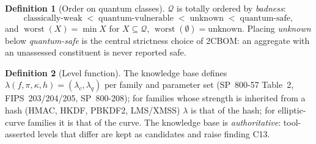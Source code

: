 \documentclass[11pt,a4paper]{article}
\newcommand{\twocbom}{2CBOM}
\newcommand{\Q}{\mathcal{Q}}
\newcommand{\worst}{\operatorname{worst}}
\theoremstyle{definition}
\newtheorem{definition}{Definition}[section]
\theoremstyle{plain}
\begin{document}
\begin{definition}[Order on quantum classes]
$\Q$ is totally ordered by \emph{badness}:
$$\text{classically-weak} \;<\; \text{quantum-vulnerable} \;<\; \text{unknown} \;<\; \text{quantum-safe},$$
and $\worst(X) = \min X$ for $X \subseteq \Q$, $\worst(\emptyset) = \text{unknown}$.
Placing \emph{unknown} below \emph{quantum-safe} is the central strictness choice of \twocbom:
an aggregate with an unassessed constituent is never reported safe.
\end{definition}

\begin{definition}[Level function]
The knowledge base defines $\lambda(f,\pi,\kappa,h) = (\lambda_c,\lambda_q)$ per family and
parameter set (SP~800-57 Table~2, FIPS~203/204/205, SP~800-208); for families whose strength is
inherited from a hash (HMAC, HKDF, PBKDF2, LMS/XMSS) $\lambda$ is that of the hash; for
elliptic-curve families it is that of the curve. The knowledge base is \emph{authoritative}:
tool-asserted levels that differ are kept as candidates and raise finding C13.
\end{definition}
\end{document}
